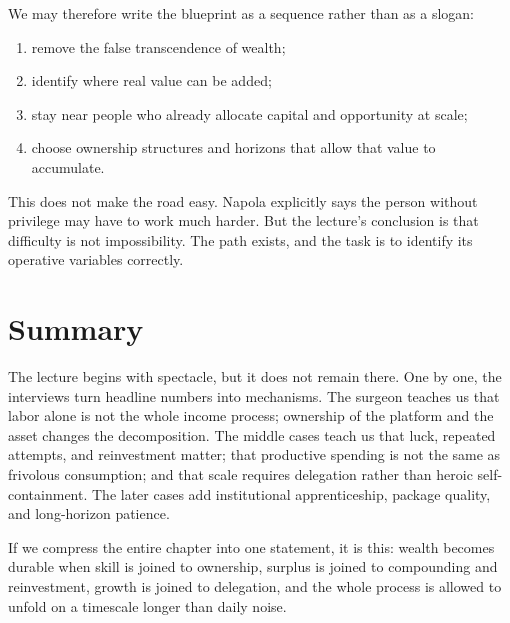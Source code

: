 We may therefore write the blueprint as a sequence rather than as a slogan:
\begin{enumerate}
\item remove the false transcendence of wealth;
\item identify where real value can be added;
\item stay near people who already allocate capital and opportunity at scale;
\item choose ownership structures and horizons that allow that value to accumulate.
\end{enumerate}

This does not make the road easy. Napola explicitly says the person without privilege may have to work much harder. But the lecture's conclusion is that difficulty is not impossibility. The path exists, and the task is to identify its operative variables correctly.

\section{Summary}

The lecture begins with spectacle, but it does not remain there. One by one, the interviews turn headline numbers into mechanisms. The surgeon teaches us that labor alone is not the whole income process; ownership of the platform and the asset changes the decomposition. The middle cases teach us that luck, repeated attempts, and reinvestment matter; that productive spending is not the same as frivolous consumption; and that scale requires delegation rather than heroic self-containment. The later cases add institutional apprenticeship, package quality, and long-horizon patience.

If we compress the entire chapter into one statement, it is this: wealth becomes durable when skill is joined to ownership, surplus is joined to compounding and reinvestment, growth is joined to delegation, and the whole process is allowed to unfold on a timescale longer than daily noise.